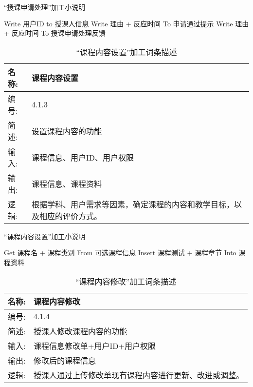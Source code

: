\begin{algorithm}[H]
    \renewcommand{\thealgorithm}{}
    \caption{“授课申请处理”加工小说明} 
    \label{alg3} 
    \begin{algorithmic}[1]
        \STATE Write 用户ID to 授课人信息 
        \STATE Write {理由} + 反应时间  To 申请通过提示
        \ELSE
        \STATE Write {理由} + 反应时间  To 授课申请处理反馈
        \ENDIF 
    \end{algorithmic} 
\end{algorithm}


\begin{table}[H]  
\caption{“课程内容设置”加工词条描述}  
\begin{center}  
    \begin{tabular}{l p{11cm}} 
        \hline
        \quad 名称: & 课程内容设置 \\
        \hline
        \quad 编号: & 4.1.3 \\
        \hline
        \quad 简述: & 设置课程内容的功能 \\
        \hline
        \quad 输入: & 课程信息、用户ID、用户权限 \\
        \hline 
        \quad 输出: & 课程信息、课程资料 \\
        \hline
        \quad 逻辑: & 根据学科、用户需求等因素，确定课程的内容和教学目标，以及相应的评价方式。 \\
        \hline
    \end{tabular}
    \label{tab1}
\end{center}
\end{table}


\begin{algorithm}[H]
    \renewcommand{\thealgorithm}{}
    \caption{“课程内容设置”加工小说明} 
    \label{alg3} 
    \begin{algorithmic}[1]
        \STATE Get 课程名 + 课程类别 From 可选课程信息
        \STATE Insert 课程测试 + 课程章节 Into 课程资料
    \end{algorithmic} 
\end{algorithm}

\begin{table}[H]  
\caption{“课程内容修改”加工词条描述}  
\begin{center}  
    \begin{tabular}{l p{11cm}} 
        \hline
        \quad 名称: & 课程内容修改 \\
        \hline
        \quad 编号: & 4.1.4 \\
        \hline
        \quad 简述: & 授课人修改课程内容的功能 \\
        \hline
        \quad 输入: & 课程信息修改单+用户ID+用户权限 \\
        \hline
        \quad 输出: & 修改后的课程信息 \\
        \hline
        \quad 逻辑: & 授课人通过上传修改单现有课程内容进行更新、改进或调整。 \\
        \hline
    \end{tabular}
    \label{tab1}
\end{center}
\end{table}


